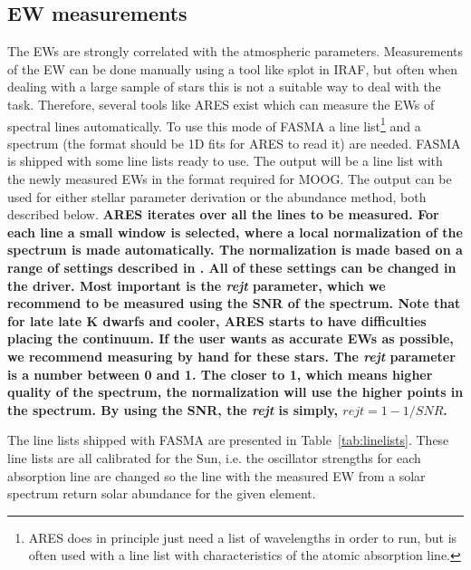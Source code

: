 \documentclass{aa}
\begin{document}
\subsection{EW measurements}
\label{sub:EW_measurements}
The EWs are strongly correlated with the atmospheric parameters. Measurements of
the EW can be done manually using a tool like splot in IRAF, but often when
dealing with a large sample of stars this is not a suitable way to deal with the
task. Therefore, several tools like ARES exist which can measure the EWs of
spectral lines automatically. To use this mode of FASMA a line
list\footnote{ARES does in principle just need a list of wavelengths in order to
run, but is often used with a line list with characteristics of the atomic
absorption line.} and a spectrum (the format should be 1D fits for ARES to read
it) are needed. FASMA is shipped with some line lists ready to use. The output
will be a line list with the newly measured EWs in the format required for MOOG.
The output can be used for either stellar parameter derivation or the abundance
method, both described below. {\bf ARES iterates over all the lines to be
measured. For each line a small window is selected, where a local normalization
of the spectrum is made automatically. The normalization is made based on a
range of settings described in \citet{Sousa2007,Sousa2015a}. All of these
settings can be changed in the driver. Most important is the \emph{rejt}
parameter, which we recommend to be measured using the SNR of the spectrum. Note
that for late late K dwarfs and cooler, ARES starts to have difficulties placing
the continuum. If the user wants as accurate EWs as possible, we recommend
measuring by hand for these stars. The \emph{rejt} parameter is a number between
0 and 1. The closer to 1, which means higher quality of the spectrum, the
normalization will use the higher points in the spectrum. By using the SNR, the
\emph{rejt} is simply, $\mathit{rejt}=1-1/SNR$.}

The line lists shipped with FASMA are presented in Table~\ref{tab:linelists}.
These line lists are all calibrated for the Sun, i.e. the oscillator strengths
for each absorption line are changed so the line with the measured EW from a
solar spectrum return solar abundance for the given element.
\end{document}
